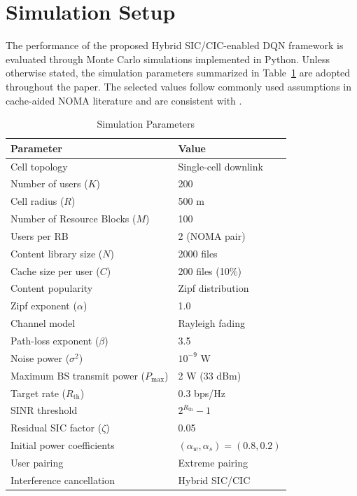 \documentclass[conference]{IEEEtran}
\begin{document}
\section{Simulation Setup}

The performance of the proposed Hybrid SIC/CIC-enabled DQN framework is evaluated through Monte Carlo simulations implemented in Python. Unless otherwise stated, the simulation parameters summarized in Table~\ref{tab:params} are adopted throughout the paper. The selected values follow commonly used assumptions in cache-aided NOMA literature and are consistent with \cite{Dani2022, Ding2017, Liu2018}.

\begin{table}[!t]
\caption{Simulation Parameters}
\label{tab:params}
\centering
\begin{tabular}{ll}
\hline
\textbf{Parameter} & \textbf{Value} \\
\hline
Cell topology & Single-cell downlink \\
Number of users ($K$) & 200 \\
Cell radius ($R$) & 500 m \\
Number of Resource Blocks ($M$) & 100 \\
Users per RB & 2 (NOMA pair) \\
Content library size ($N$) & 2000 files \\
Cache size per user ($C$) & 200 files (10\%) \\
Content popularity & Zipf distribution \\
Zipf exponent ($\alpha$) & 1.0 \\
Channel model & Rayleigh fading \\
Path-loss exponent ($\beta$) & 3.5 \\
Noise power ($\sigma^2$) & $10^{-9}$ W \\
Maximum BS transmit power ($P_{\max}$) & 2 W (33 dBm) \\
Target rate ($R_{\mathrm{th}}$) & 0.3 bps/Hz \\
SINR threshold & $2^{R_{\mathrm{th}}}-1$ \\
Residual SIC factor ($\zeta$) & 0.05 \\
Initial power coefficients & $(\alpha_w,\alpha_s)=(0.8,0.2)$ \\
User pairing & Extreme pairing \\
Interference cancellation & Hybrid SIC/CIC \\

\end{tabular}
\end{table}
\end{document}
